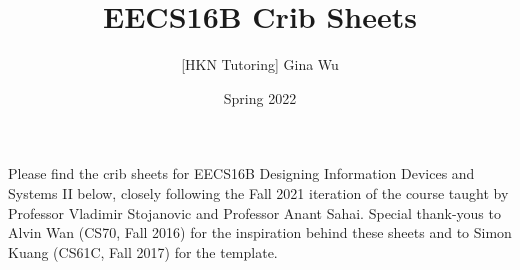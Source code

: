 \documentclass[10pt, article, oneside]{memoir}
\title{\textbf{EECS16B Crib Sheets}}
\author{[HKN Tutoring] Gina Wu}
\date{Spring 2022}
\begin{document}
	\maketitle
	
	Please find the crib sheets for EECS16B Designing Information Devices and Systems II below, closely following the Fall 2021 iteration of the course taught by Professor Vladimir Stojanovic and Professor Anant Sahai. Special thank-yous to Alvin Wan (CS70, Fall 2016) for the inspiration behind these sheets and to Simon Kuang (CS61C, Fall 2017) for the template.
	
	\tableofcontents*
	\newpage

	
\end{document}
